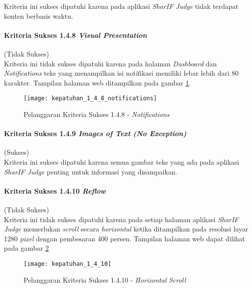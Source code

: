 Kriteria ini sukses dipatuhi karena pada aplikasi \textit{SharIF Judge} tidak terdapat konten berbasis waktu.


\paragraph{Kriteria Sukses 1.4.8 \textit{Visual Presentation}}
\label{subsubsec:kepatuhan_kriteria_1.4.8}
(Tidak Sukses) \\

Kriteria ini tidak sukses dipatuhi karena pada halaman \textit{Dashboard} dan \textit{Notifications} teks yang menampilkan isi notifikasi memiliki lebar lebih dari 80 karakter. Tampilan halaman web ditampilkan pada gambar \ref{fig:kepatuhan_1_4_8_notifications}.
\begin{figure}[H]
	\centering  
	\texttt{[image: kepatuhan\_1\_4\_8\_notifications]}  
	\caption[Pelanggaran Kriteria Sukses 1.4.8 - Lebar \textit{Notifications}]{Pelanggaran Kriteria Sukses 1.4.8 - \textit{Notifications}} 
	\label{fig:kepatuhan_1_4_8_notifications} 
\end{figure}

\paragraph{Kriteria Sukses 1.4.9 \textit{Images of Text (No Exception)}}
\label{subsubsec:kepatuhan_kriteria_1.4.9}
(Sukses) \\

Kriteria ini sukses dipatuhi karena semua gambar teks yang ada pada aplikasi \textit{SharIF Judge} penting untuk informasi yang disampaikan.

\paragraph{Kriteria Sukses 1.4.10 \textit{Reflow}}
\label{subsubsec:kepatuhan_kriteria_1.4.10}
(Tidak Sukses) \\

Kriteria ini tidak sukses dipatuhi karena pada setiap halaman aplikasi \textit{SharIF Judge} memerlukan \textit{scroll} secara \textit{horizontal} ketika ditampilkan pada resolusi layar 1280 \textit{pixel} dengan pembesaran 400 persen. Tampilan halaman web dapat dilihat pada gambar \ref{fig:kepatuhan_1_4_10_reflow}
\begin{figure}[H]
	\centering  
	\texttt{[image: kepatuhan\_1\_4\_10]}  
	\caption[Pelanggaran Kriteria Sukses 1.4.10 - \textit{Horizontal} \textit{Scroll}]{Pelanggaran Kriteria Sukses 1.4.10 - \textit{Horizontal} \textit{Scroll}} 
	\label{fig:kepatuhan_1_4_10_reflow} 
\end{figure}


